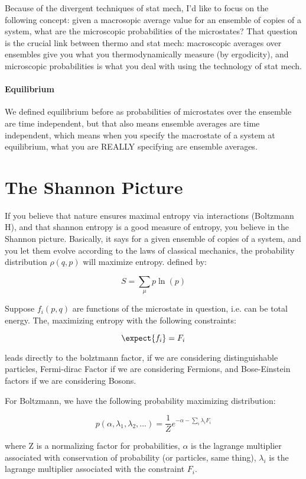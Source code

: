 Because of the divergent techniques of stat mech, I'd like to focus on the following concept:  given a macrosopic average value for an ensemble of copies of a system, what are the microscopic probabilities of the microstates?  That question is the crucial link between thermo and stat mech: macroscopic averages over ensembles give you what you thermodynamically measure (by ergodicity), and microscopic probabilities is what you deal with using the technology of stat mech.

\paragraph{Equilibrium}

We defined equilibrium before as probabilities of microstates over the ensemble are time independent, but that also means ensemble averages are time independent, which means when you specify the macrostate of a system at equilibrium, what you are REALLY specifying are ensemble averages.

\section{The Shannon Picture}

If you believe that nature ensures maximal entropy via interactions (Boltzmann H), and that shannon entropy is a good measure of entropy, you believe in the Shannon picture.  Basically, it says for a given ensemble of copies of a system, and you let them evolve according to the laws of classical mechanics, the probability distribution $\rho(q,p)$ will maximize entropy. defined by:


$$ S = \sum_{\mu} p \ln(p)$$

Suppose $f_i(p,q)$ are functions of the microstate in question, i.e. can be total energy.  The, maximizing entropy with the following constraints:

$$\expect{f_i}= F_i$$

leads directly to the bolztmann factor, if we are considering distinguishable particles, Fermi-dirac Factor if we are considering Fermions, and Bose-Einstein factors if we are considering Bosons.

For Boltzmann, we have the following probability maximizing distribution:

$$p(\alpha, \lambda_1, \lambda_2,...) = \frac{1}{Z} e^{- \alpha - \sum_i \lambda_i F_i}$$

where Z is a normalizing factor for probabilities, $\alpha$ is the lagrange multiplier associated with conservation of probability (or particles, same thing), $\lambda_i$ is the lagrange multiplier associated with the constraint $F_i$.


